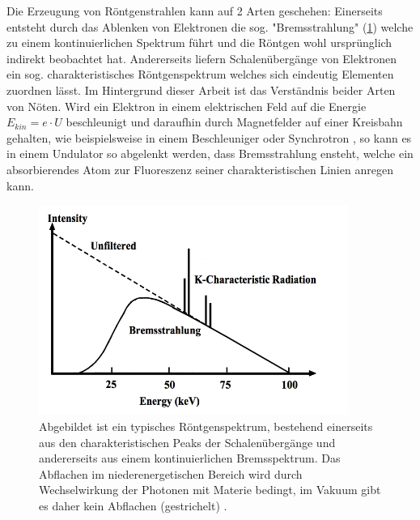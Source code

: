 \noindent Die Erzeugung von Röntgenstrahlen kann auf 2 Arten geschehen: Einerseits entsteht durch das Ablenken von Elektronen die sog. "Bremsstrahlung"\,\,(\cref{fig:spectrumXray}) welche zu einem kontinuierlichen Spektrum führt und die Röntgen wohl ursprünglich indirekt beobachtet hat. Andererseits liefern Schalenübergänge von Elektronen ein sog. charakteristisches Röntgenspektrum welches sich eindeutig Elementen zuordnen lässt. Im Hintergrund dieser Arbeit ist das Verständnis beider Arten von Nöten. Wird ein Elektron in einem elektrischen Feld auf die Energie $E_{kin} = e \cdot U$ beschleunigt und daraufhin durch Magnetfelder auf einer Kreisbahn gehalten, wie beispielsweise in einem Beschleuniger oder Synchrotron \cite[S.~33]{bbbook}, so kann es in einem Undulator so abgelenkt werden, dass Bremsstrahlung ensteht, welche ein absorbierendes Atom zur Fluoreszenz seiner charakteristischen Linien anregen kann.\newline

\begin{figure}[H] %
  \centering
     \includegraphics[width=0.9\textwidth]{illustrations/XrtSpectrum_edit.png}
  \caption[Röntgenspektrum charakteristisch und kontinuierlich]{Abgebildet ist ein typisches Röntgenspektrum, bestehend einerseits aus den charakteristischen Peaks der Schalenübergänge und andererseits aus einem kontinuierlichen Bremsspektrum. Das Abflachen im niederenergetischen Bereich wird durch Wechselwirkung der Photonen mit Materie bedingt, im Vakuum gibt es daher kein Abflachen (gestrichelt) \cite[bearbeitet]{spectrum}.}
  \label{fig:spectrumXray}
\end{figure}

